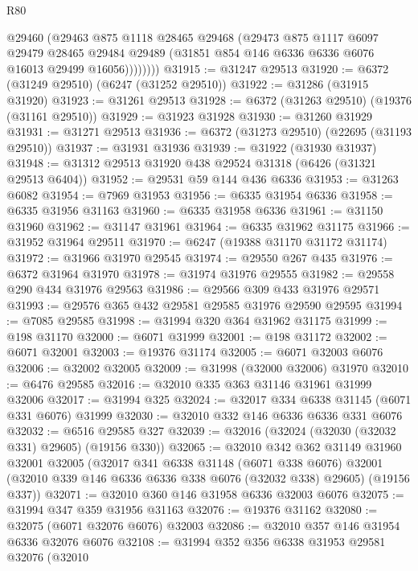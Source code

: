 \begin{lexlean}{R80}
\begin{coremodule}
              @29460
              (@29463
                @875
                @1118
                @28465
                @29468
                (@29473
                  @875
                  @1117
                  @6097
                  @29479
                  @28465
                  @29484
                  @29489
                  (@31851 @854 @146 @6336 @6336 @6076 @16013 @29499 @16056))))))))
@31915 := @31247 @29513
@31920 := @6372 (@31249 @29510) (@6247 (@31252 @29510))
@31922 := @31286 (@31915 @31920)
@31923 := @31261 @29513
@31928 := @6372 (@31263 @29510) (@19376 (@31161 @29510))
@31929 := @31923 @31928
@31930 := @31260 @31929
@31931 := @31271 @29513
@31936 := @6372 (@31273 @29510) (@22695 (@31193 @29510))
@31937 := @31931 @31936
@31939 := @31922 (@31930 @31937)
@31948 := @31312 @29513 @31920 @438 @29524 @31318 (@6426 (@31321 @29513 @6404))
@31952 := @29531 @59 @144 @436 @6336
@31953 := @31263 @6082
@31954 := @7969 @31953
@31956 := @6335 @31954 @6336
@31958 := @6335 @31956 @31163
@31960 := @6335 @31958 @6336
@31961 := @31150 @31960
@31962 := @31147 @31961
@31964 := @6335 @31962 @31175
@31966 := @31952 @31964 @29511
@31970 := @6247 (@19388 @31170 @31172 @31174)
@31972 := @31966 @31970 @29545
@31974 := @29550 @267 @435
@31976 := @6372 @31964 @31970
@31978 := @31974 @31976 @29555
@31982 := @29558 @290 @434 @31976 @29563
@31986 := @29566 @309 @433 @31976 @29571
@31993 := @29576 @365 @432 @29581 @29585 @31976 @29590 @29595
@31994 := @7085 @29585
@31998 := @31994 @320 @364 @31962 @31175
@31999 := @198 @31170
@32000 := @6071 @31999
@32001 := @198 @31172
@32002 := @6071 @32001
@32003 := @19376 @31174
@32005 := @6071 @32003 @6076
@32006 := @32002 @32005
@32009 := @31998 (@32000 @32006) @31970
@32010 := @6476 @29585
@32016 := @32010 @335 @363 @31146 @31961 @31999 @32006
@32017 := @31994 @325
@32024 := @32017 @334 @6338 @31145 (@6071 @331 @6076) @31999
@32030 := @32010 @332 @146 @6336 @6336 @331 @6076
@32032 := @6516 @29585 @327
@32039 := @32016 (@32024 (@32030 (@32032 @331) @29605) (@19156 @330))
@32065 := @32010
    @342
    @362
    @31149
    @31960
    @32001
    @32005
    (@32017
      @341
      @6338
      @31148
      (@6071 @338 @6076)
      @32001
      (@32010 @339 @146 @6336 @6336 @338 @6076 (@32032 @338) @29605)
      (@19156 @337))
@32071 := @32010 @360 @146 @31958 @6336 @32003 @6076
@32075 := @31994 @347 @359 @31956 @31163
@32076 := @19376 @31162
@32080 := @32075 (@6071 @32076 @6076) @32003
@32086 := @32010 @357 @146 @31954 @6336 @32076 @6076
@32108 := @31994
    @352
    @356
    @6338
    @31953
    @29581
    @32076
    (@32010

\end{coremodule}
\end{lexlean}
